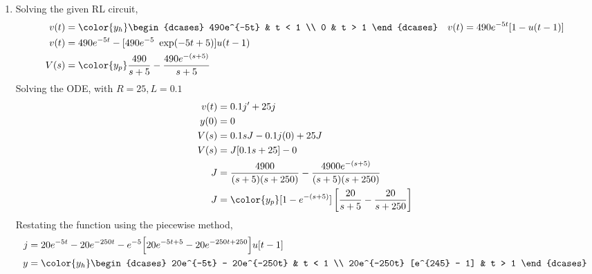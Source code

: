 \begin{enumerate}
    \item Solving the given RL circuit,
          \begin{align}
              v(t) & = \color{y_h}\begin{dcases}
                                      490e^{-5t} & t < 1 \\
                                      0          & t > 1
                                  \end{dcases}                               &
              v(t) & = 490e^{-5t}[1 - u(t-1)]                                  \\
              v(t) & = 490e^{-5t} - [490e^{-5}\ \exp(-5t+5)]u(t-1)             \\
              V(s) & = \color{y_p} \frac{490}{s+5} - \frac{490e^{-(s+5)}}{s+5}
          \end{align}
          Solving the ODE, with $ R = 25, L = 0.1 $
          \begin{align}
              v(t) & = 0.1j' + 25j                                       \\
              y(0) & = 0                                                 \\
              V(s) & = 0.1sJ - 0.1j(0) + 25J                             \\
              V(s) & = J[0.1s + 25] - 0                                  \\
              J    & = \frac{4900}{(s+5)(s+250)} - \frac{4900e^{-(s+5)}}
              {(s+5)(s+250)}                                             \\
              J    & = \color{y_p} [1 - e^{-(s+5)}]\left[ \frac{20}{s+5}
                  - \frac{20}{s+250} \right]
          \end{align}
          Restating the function using the piecewise method,
          \begin{align}
              j & = 20e^{-5t} - 20e^{-250t}  - e^{-5}\Big[20e^{-5t+5}
              - 20e^{-250t+250}\Big]u[t - 1]                          \\
              y & = \color{y_h}
              \begin{dcases}
                  20e^{-5t} - 20e^{-250t}   & t < 1 \\
                  20e^{-250t} [e^{245} - 1] & t > 1
              \end{dcases}
          \end{align}


\end{enumerate}
